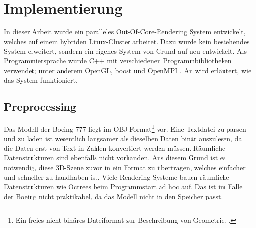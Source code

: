 
\chapter{Implementierung}
\label{chap:impl}
%
%
%
%

In dieser Arbeit wurde ein paralleles Out-Of-Core-Rendering System entwickelt, welches auf einem hybriden Linux-Cluster arbeitet. Dazu wurde kein bestehendes System erweitert, sondern ein eigenes System von Grund auf neu entwickelt. Als Programmiersprache wurde C++ mit verschiedenen Programmbibliotheken verwendet; unter anderem OpenGL, boost und OpenMPI \cite{mpi}. An wird erläutert, wie das System funktioniert.\\

\section{Preprocessing}
\label{sec:impl:preprocessing}
Das Modell der Boeing 777 liegt im OBJ-Format\footnote{Ein freies nicht-binäres Dateiformat zur Beschreibung von Geometrie. \cite{obj}. } vor. Eine Textdatei zu parsen und zu laden ist wesentlich langsamer als dieselben Daten binär auszulesen, da die Daten erst von Text in Zahlen konvertiert werden müssen. Räumliche Datenstrukturen sind ebenfalls nicht vorhanden. Aus diesem Grund ist es notwendig, diese 3D-Szene zuvor in ein Format zu übertragen, welches einfacher und schneller zu handhaben ist. Viele Rendering-Systeme bauen räumliche Datenstrukturen wie Octrees beim Programmstart ad hoc auf. Das ist im Falle der Boeing nicht praktikabel, da das Modell nicht in den Speicher passt.

